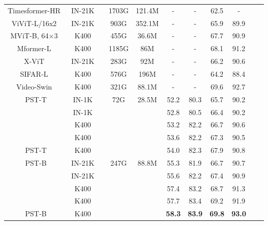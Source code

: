 \documentclass[runningheads]{llncs}
\begin{document}
\begin{table}[h]
\begin{center}
{\begin{tabular}{ccccccccccc}
					
					\hline 
					
					Timesformer-HR~\cite{GedasBertasius2021IsSA} & IN-21K &  & 1703G & 121.4M & - & - & 62.5  & -   \\
					
					
					ViViT-L/16x2~\cite{AnuragArnab2021ViViTAV} & IN-21K &  & 903G & 352.1M & - & - & 65.9  & 89.9   \\
					MViT-B, 64×3~\cite{Fan_2021_ICCV}  & K400 &  & 455G& 36.6M & - & - & 67.7  & 90.9   \\
					Mformer-L~\cite{patrick2021keeping} & K400 &  & 1185G& 86M & - & - & 68.1  & 91.2   \\
					X-ViT~\cite{bulat2021space} & IN-21K &  & 283G & 92M & - & - & 66.2  & 90.6   \\
					SIFAR-L~\cite{SIFAR}  & K400 &  & 576G & 196M & - & - & 64.2  & 88.4   \\
					Video-Swin~\cite{liu2021video} & K400 &  & 321G & 88.1M & - & - & 69.6  & 92.7   \\
					\hline 
					\multirow{4}{*}{PST-T} & IN-1K &  & \multirow{5}{*}{72G}& \multirow{5}{*}{28.5M} & 52.2 & 80.3 & 65.7 & 90.2   \\
					& IN-1K &  &   & & 52.8 & 80.5 & 66.4 & 90.2   \\
					& K400 &  &   &  & 53.2 & 82.2 & 66.7 & 90.6 \\
					& K400 &  &   &  & 53.6 & 82.2 & 67.3 &  90.5  \\ 
					\multirow{1}{*}{PST-T} & K400 &  & 74G & & 54.0 & 82.3 & 67.9 & 90.8   \\
					\hline
					\multirow{4}{*}{PST-B} & IN-21K &  & \multirow{5}{*}{247G} & \multirow{5}{*}{88.8M} & 55.3 & 81.9 & 66.7 & 90.7 \\
					
					
					&  IN-21K & & & & 55.6 & 82.2 & 67.4 & 90.9  \\
					&  K400 & &  & & 57.4 & 83.2 &68.7  & 91.3   \\
					&  K400 & &  & & 57.7 & 83.4 & 69.2 & 91.9  \\ 
					\multirow{1}{*}{PST-B} & K400 &  & 252G &  & \textbf{58.3} & \textbf{83.9} & \textbf{69.8} & \textbf{93.0} \\
					\hline
					
					
					
					\hline
					
					
				\end{tabular}
			}
		\end{center}
		
		
	\end{table}	
	
\end{document}
